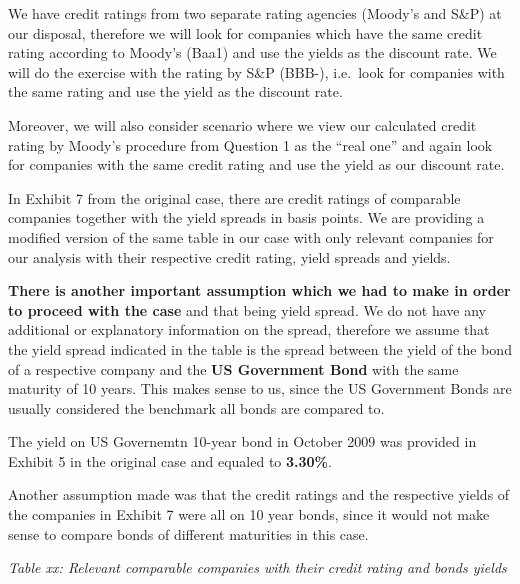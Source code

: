 \documentclass[
]{article}
\begin{document}
We have credit ratings from two separate rating agencies (Moody's and
S\&P) at our disposal, therefore we will look for companies which have
the same credit rating according to Moody's (Baa1) and use the yields as
the discount rate. We will do the exercise with the rating by S\&P
(BBB-), i.e.~look for companies with the same rating and use the yield
as the discount rate.

Moreover, we will also consider scenario where we view our calculated
credit rating by Moody's procedure from Question 1 as the ``real one''
and again look for companies with the same credit rating and use the
yield as our discount rate.

In Exhibit 7 from the original case, there are credit ratings of
comparable companies together with the yield spreads in basis points. We
are providing a modified version of the same table in our case with only
relevant companies for our analysis with their respective credit rating,
yield spreads and yields.

\textbf{There is another important assumption which we had to make in
order to proceed with the case} and that being yield spread. We do not
have any additional or explanatory information on the spread, therefore
we assume that the yield spread indicated in the table is the spread
between the yield of the bond of a respective company and the \textbf{US
Government Bond} with the same maturity of 10 years. This makes sense to
us, since the US Government Bonds are usually considered the benchmark
all bonds are compared to.

The yield on US Governemtn 10-year bond in October 2009 was provided in
Exhibit 5 in the original case and equaled to \textbf{3.30\%}.

Another assumption made was that the credit ratings and the respective
yields of the companies in Exhibit 7 were all on 10 year bonds, since it
would not make sense to compare bonds of different maturities in this
case.

\emph{Table xx: Relevant comparable companies with their credit rating
and bonds yields}
\end{document}

